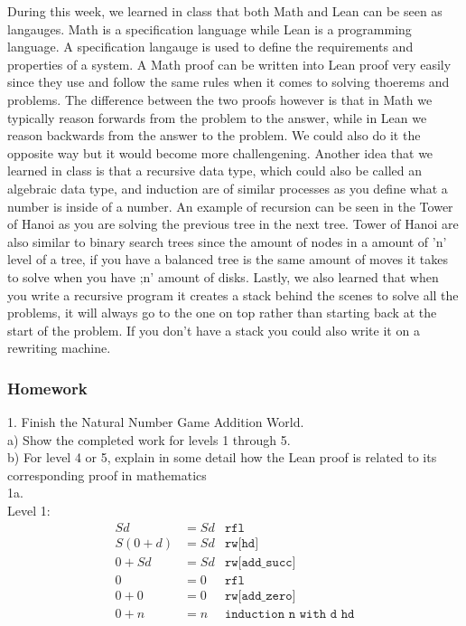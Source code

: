 \documentclass{article}
\theoremstyle{theorem}
\theoremstyle{definition}
\theoremstyle{remark}
\begin{document}
During this week, we learned in class that both Math and Lean can be seen as langauges. Math is a specification language while Lean is a programming language. A
specification langauge is used to define the requirements and properties of a system. A Math proof can be written into Lean proof very easily since they use and
follow the same rules when it comes to solving thoerems and problems. The difference between the two proofs however is that in Math we typically reason forwards
from the problem to the answer, while in Lean we reason backwards from the answer to the problem. We could also do it the opposite way but it would become more
challengening. Another idea that we learned in class is that a recursive data type, which could also be called an algebraic data type, and induction are of 
similar processes as you define what a number is inside of a number. An example of recursion can be seen in the Tower of Hanoi as you are solving the previous
tree in the next tree. Tower of Hanoi are also similar to binary search trees since the amount of nodes in a amount of 'n' level of a tree, if you have a balanced
tree is the same amount of moves it takes to solve when you have ;n' amount of disks. Lastly, we also learned that when you write a recursive program it creates 
a stack behind the scenes to solve all the problems, it will always go to the one on top rather than starting back at the start of the problem. If you don't have
a stack you could also write it on a rewriting machine.

\subsubsection{Homework}

1. Finish the Natural Number Game Addition World. \\
\hspace*{2em}a) Show the completed work for levels 1 through 5. \\
\hspace*{2em}b) For level 4 or 5, explain in some detail how the Lean proof is related to its corresponding proof in mathematics \\

1a.\\
Level 1:
\begin{align*}
  Sd&=Sd & \texttt{rfl} \\
  S(0+d)&=Sd & \texttt{rw[hd]} \\
  0+Sd &= Sd & \texttt{rw[add\_succ]} \\
  0&=0 & \texttt{rfl} \\
  0+0 &= 0 & \texttt{rw[add\_zero]} \\
  0+n &= n & \texttt{induction n with d hd} \\
\end{align*}
\end{document}
